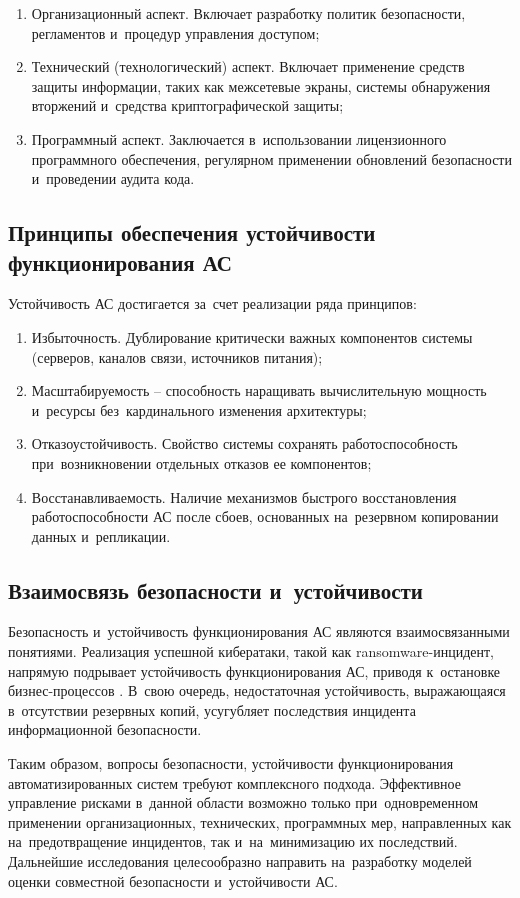 \documentclass{ou}
\begin{document}
\begin{enumerate}[leftmargin=0em, itemindent=3.75em, nosep, label=\arabic*)]
\item Организационный аспект. Включает разработку политик безопасности, регламентов и~процедур управления доступом;
\item Технический (технологический) аспект. Включает применение средств защиты информации, таких как межсетевые экраны, системы обнаружения вторжений и~средства криптографической защиты;
\item Программный аспект. Заключается в~использовании лицензионного программного обеспечения, регулярном применении обновлений безопасности и~проведении аудита кода.
\end{enumerate}
\subsection{Принципы обеспечения устойчивости функционирования АС}
Устойчивость АС достигается за~счет реализации ряда принципов:
\begin{enumerate}[leftmargin=0em, itemindent=3.75em, nosep, label=\arabic*)]
\item Избыточность. Дублирование критически важных компонентов системы (серверов, каналов связи, источников питания);
\item Масштабируемость -- способность наращивать вычислительную мощность и~ресурсы без~кардинального изменения архитектуры;
\item Отказоустойчивость. Свойство системы сохранять работоспособность при~возникновении отдельных отказов ее компонентов;
\item Восстанавливаемость. Наличие механизмов быстрого восстановления работоспособности АС после сбоев, основанных на~резервном копировании данных и~репликации.
\end{enumerate}
\subsection{Взаимосвязь безопасности и~устойчивости}
Безопасность и~устойчивость функционирования АС являются взаимосвязанными понятиями. Реализация успешной кибератаки, такой как ransomware-инцидент, напрямую подрывает устойчивость функционирования АС, приводя к~остановке бизнес-процессов . В~свою очередь, недостаточная устойчивость, выражающаяся в~отсутствии резервных копий, усугубляет последствия инцидента информационной безопасности.

Таким образом, вопросы безопасности, устойчивости функционирования автоматизированных систем требуют комплексного подхода. Эффективное управление рисками в~данной области возможно только при~одновременном применении организационных, технических, программных мер, направленных как на~предотвращение инцидентов, так и~на~минимизацию их последствий. Дальнейшие исследования целесообразно направить на~разработку моделей оценки совместной безопасности и~устойчивости АС.
\newpage
\end{document}
